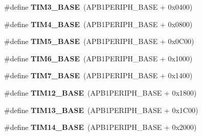 \begin{DoxyCompactItemize}
\item 
\#define {\bfseries T\+I\+M3\+\_\+\+B\+A\+SE}~(A\+P\+B1\+P\+E\+R\+I\+P\+H\+\_\+\+B\+A\+SE + 0x0400)\hypertarget{group___peripheral__memory__map_gaf0c34a518f87e1e505cd2332e989564a}{}\label{group___peripheral__memory__map_gaf0c34a518f87e1e505cd2332e989564a}

\item 
\#define {\bfseries T\+I\+M4\+\_\+\+B\+A\+SE}~(A\+P\+B1\+P\+E\+R\+I\+P\+H\+\_\+\+B\+A\+SE + 0x0800)\hypertarget{group___peripheral__memory__map_ga56e2d44b0002f316527b8913866a370d}{}\label{group___peripheral__memory__map_ga56e2d44b0002f316527b8913866a370d}

\item 
\#define {\bfseries T\+I\+M5\+\_\+\+B\+A\+SE}~(A\+P\+B1\+P\+E\+R\+I\+P\+H\+\_\+\+B\+A\+SE + 0x0\+C00)\hypertarget{group___peripheral__memory__map_ga3e1671477190d065ba7c944558336d7e}{}\label{group___peripheral__memory__map_ga3e1671477190d065ba7c944558336d7e}

\item 
\#define {\bfseries T\+I\+M6\+\_\+\+B\+A\+SE}~(A\+P\+B1\+P\+E\+R\+I\+P\+H\+\_\+\+B\+A\+SE + 0x1000)\hypertarget{group___peripheral__memory__map_ga8268ec947929f192559f28c6bf7d1eac}{}\label{group___peripheral__memory__map_ga8268ec947929f192559f28c6bf7d1eac}

\item 
\#define {\bfseries T\+I\+M7\+\_\+\+B\+A\+SE}~(A\+P\+B1\+P\+E\+R\+I\+P\+H\+\_\+\+B\+A\+SE + 0x1400)\hypertarget{group___peripheral__memory__map_ga0ebf54364c6a2be6eb19ded6b18b6387}{}\label{group___peripheral__memory__map_ga0ebf54364c6a2be6eb19ded6b18b6387}

\item 
\#define {\bfseries T\+I\+M12\+\_\+\+B\+A\+SE}~(A\+P\+B1\+P\+E\+R\+I\+P\+H\+\_\+\+B\+A\+SE + 0x1800)\hypertarget{group___peripheral__memory__map_ga33dea32fadbaecea161c2ef7927992fd}{}\label{group___peripheral__memory__map_ga33dea32fadbaecea161c2ef7927992fd}

\item 
\#define {\bfseries T\+I\+M13\+\_\+\+B\+A\+SE}~(A\+P\+B1\+P\+E\+R\+I\+P\+H\+\_\+\+B\+A\+SE + 0x1\+C00)\hypertarget{group___peripheral__memory__map_gad20f79948e9359125a40bbf6ed063590}{}\label{group___peripheral__memory__map_gad20f79948e9359125a40bbf6ed063590}

\item 
\#define {\bfseries T\+I\+M14\+\_\+\+B\+A\+SE}~(A\+P\+B1\+P\+E\+R\+I\+P\+H\+\_\+\+B\+A\+SE + 0x2000)\hypertarget{group___peripheral__memory__map_ga862855347d6e1d92730dfe17ee8e90b8}{}\label{group___peripheral__memory__map_ga862855347d6e1d92730dfe17ee8e90b8}


\end{DoxyCompactItemize}
